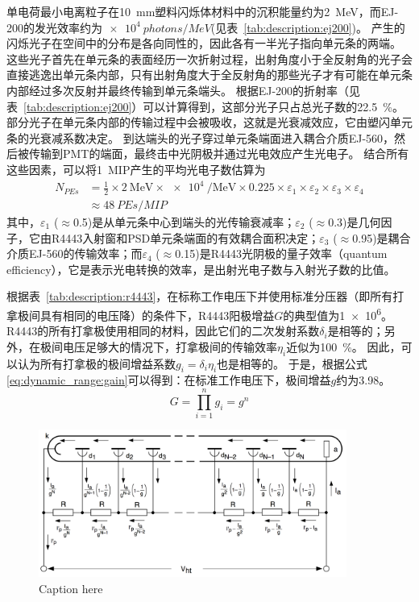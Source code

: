 单电荷最小电离粒子在\SI{10}{mm}塑料闪烁体材料中的沉积能量约为\SI{2}{MeV}，而EJ-200的发光效率约为$\SI{e4}{photons/MeV}$(见表~\ref{tab:description:ej200})。
产生的闪烁光子在空间中的分布是各向同性的，因此各有一半光子指向单元条的两端。
这些光子首先在单元条的表面经历一次折射过程，出射角度小于全反射角的光子会直接逃逸出单元条内部，只有出射角度大于全反射角的那些光子才有可能在单元条内部经过多次反射并最终传输到单元条端头。
根据EJ-200的折射率（见表~\ref{tab:description:ej200}）可以计算得到，这部分光子只占总光子数的\SI{22.5}{\percent}。
部分光子在单元条内部的传输过程中会被吸收，这就是光衰减效应，它由塑闪单元条的光衰减系数决定。
到达端头的光子穿过单元条端面进入耦合介质EJ-560，然后被传输到PMT的端面，最终击中光阴极并通过光电效应产生光电子。
结合所有这些因素，可以将\SI{1}{MIP}产生的平均光电子数估算为
\begin{align}
 N_{PEs} &= \frac{1}{2} \times \SI[per-mode=symbol]{2}{\mega\electronvolt} \times \SI{e4}{\per\mega\electronvolt} \times 0.225
           \times \varepsilon_{1} \times \varepsilon_{2} \times \varepsilon_{3} \times \varepsilon_{4} \nonumber \\
         &\approx \SI{48}{PEs\per{MIP}}
\label{eq:dynamic_range:pe_estimation}
\end{align}
其中，$\varepsilon_1$ ($\approx$0.5)是从单元条中心到端头的光传输衰减率；$\varepsilon_2$ ($\approx$0.3)是几何因子，它由R4443入射窗和PSD单元条端面的有效耦合面积决定；$\varepsilon_3$ ($\approx$0.95)是耦合介质EJ-560的传输效率；而$\varepsilon_4$ ($\approx$0.15)是R4443光阴极的量子效率（quantum efficiency），它是表示光电转换的效率，是出射光电子数与入射光子数的比值。

根据表~\ref{tab:description:r4443}，在标称工作电压下并使用标准分压器（即所有打拿极间具有相同的电压降）的条件下，R4443阳极增益$G$的典型值为\SI{1e6}{}。
R4443的所有打拿极使用相同的材料，因此它们的二次发射系数$\delta_i$是相等的；另外，在极间电压足够大的情况下，打拿极间的传输效率$\eta_i$近似为\SI{100}{\percent}。
因此，可以认为所有打拿极的极间增益系数$g_i=\delta_i\eta_i$也是相等的。
于是，根据公式\ref{eq:dynamic_range:gain}可以得到：在标准工作电压下，极间增益$g$约为3.98。
\begin{equation}
	G = \prod_{i=1}^{n} g_i = g^n
	\label{eq:dynamic_range:gain}
\end{equation}

\begin{figure}[!htb]
	\centering
	\includegraphics[width=0.9\textwidth]{chap/dynamic_range/fig/pmt_current_distribution_photonics.png}
	\caption{Caption here}
	\label{fig:figure1}
\end{figure}

